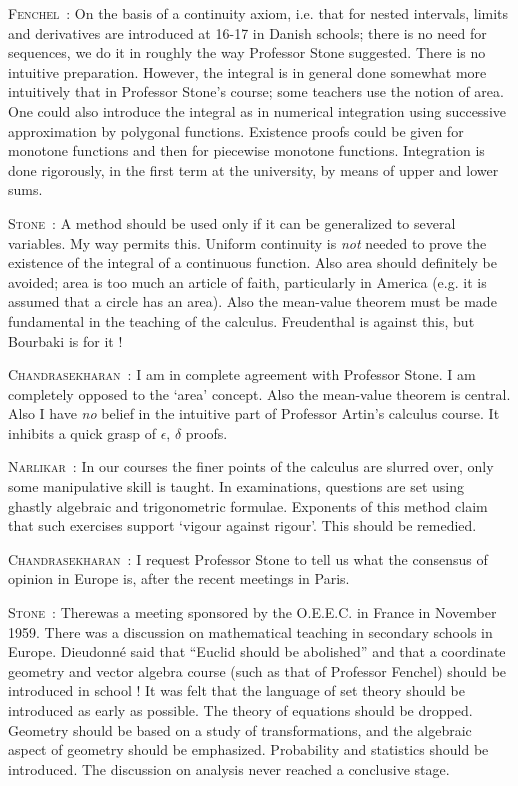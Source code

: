 \smallskip
\noindent
\textsc{Fenchel}~: On the basis of a continuity axiom, i.e. that for nested intervals, limits and derivatives are introduced at 16-17 in Danish schools; there is no need for sequences, we do it in roughly the way Professor Stone suggested. There is no intuitive preparation. However, the integral is in general done somewhat more intuitively that in Professor Stone's course; some teachers use the notion of area. One could also introduce the integral as in numerical integration using successive approximation by polygonal functions. Existence proofs could be given for monotone functions and then for piecewise monotone functions. Integration is done rigorously, in the first term at the university, by means of upper and lower sums. 

\smallskip
\noindent
\textsc{Stone}~: A method should be used only if it can be generalized to several variables. My way permits this. Uniform continuity is {\em not} needed to prove the existence of the integral of a continuous function. Also area should definitely be avoided; area is too much an article of faith, particularly in America (e.g. it is assumed that a circle has an area). Also the mean-value theorem must be made fundamental in the teaching of the calculus. Freudenthal is against this, but Bourbaki is for it !

\smallskip
\noindent
\textsc{Chandrasekharan}~: I am in complete agreement with Professor Stone. I am completely opposed to the `area' concept. Also the mean-value theorem is central. Also I have {\em no} belief in the intuitive part of Professor Artin's calculus course. It inhibits a quick grasp of $\epsilon$, $\delta$ proofs.

\smallskip
\noindent
\textsc{Narlikar}~: In our courses the finer points of the calculus are slurred over, only some manipulative skill is taught. In examinations, questions are set using ghastly algebraic and trigonometric formulae. Exponents of this method claim that such exercises support `vigour against rigour'. This should be remedied.

\smallskip
\noindent
\textsc{Chandrasekharan}~: I request Professor Stone to tell us what the consensus of opinion in Europe is, after the recent meetings in Paris.

\smallskip
\noindent
\textsc{Stone}~: There\pageoriginale was a meeting sponsored by the O.E.E.C. in France in November 1959. There was a discussion on mathematical teaching in secondary schools in Europe. Dieudonn\'e said that ``Euclid should be abolished'' and that a coordinate geometry and vector algebra course (such as that of Professor Fenchel) should be introduced in school ! It was felt that the language of set theory should be introduced as early as possible. The theory of equations should be dropped. Geometry should be based on a study of transformations, and the algebraic aspect of geometry should be emphasized. Probability and statistics should be introduced. The discussion on analysis never reached a conclusive stage.

